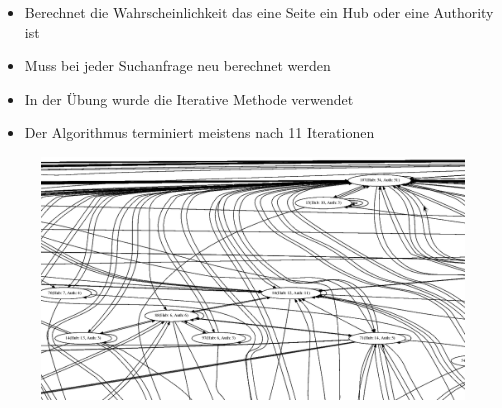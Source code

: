\begin{frame}[c]
\begin{itemize}
  \item Berechnet die Wahrscheinlichkeit das eine Seite ein Hub oder eine Authority ist
  \item Muss bei jeder Suchanfrage neu berechnet werden
  \item In der Übung wurde die Iterative Methode verwendet
  \item Der Algorithmus terminiert meistens nach 11 Iterationen
\end{itemize}
\end{frame}

\begin{frame}[c]
\begin{figure}[htp]
\begin{center}
  \includegraphics[height=1\textheight]{graphics/hitsGraph.png}
\end{center}
\end{figure}

\end{frame}